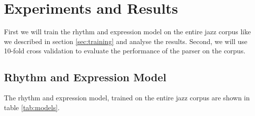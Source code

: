 \chapter{Experiments and Results}
\label{sec:results}

First we will train the rhythm and expression model on the entire jazz corpus like we described in section \ref{sec:training} and analyse the results. Second, we will use 10-fold cross validation to evaluate the performance of the parser on the corpus.

\section{Rhythm and Expression Model}

The rhythm and expression model, trained on the entire jazz corpus are shown in table \ref{tab:models}. 

